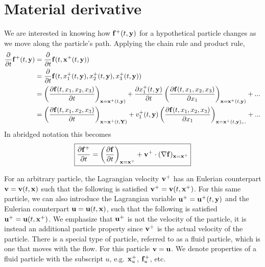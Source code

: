 \documentclass[oneside,a4paper,11pt]{report}
\begin{document}
\section{Material derivative}

We are interested in knowing how $\mathbf{f}^+(t,\mathbf{y})$ for a hypothetical particle changes as we move along the particle's path. Applying the chain rule and product rule,
\begin{align}
\frac{\partial}{\partial t} \mathbf{f}^+(t,\mathbf{y})&= \frac{\partial}{\partial t} \mathbf{f}(t,\mathbf{x}^+(t,\mathbf{y})) \nonumber \\
&=  \frac{\partial}{\partial t} \mathbf{f}(t,x_1^+(t,\mathbf{y}), x_2^+(t,\mathbf{y}), x_3^+(t,\mathbf{y})) \nonumber \\
&=\left( \frac{\partial \mathbf{f}(t,x_1,x_2,x_3)}{\partial t}\right )_{\mathbf{x}=\mathbf{x}^+(t,\mathbf{y})} + \frac{\partial x_1^+(t,\mathbf{y})}{\partial t} \left ( \frac{\partial \mathbf{f}(t,x_1,x_2,x_3)}{\partial x_1} \right )_{\mathbf{x} = \mathbf{x}^+(t,\mathbf{y})} + ...\nonumber \\
&=\left ( \frac{\partial \mathbf{f}(t,x_1,x_2,x_3)}{\partial t} \right)_{\mathbf{x}=\mathbf{x}^+(t,\mathbf{Y})} + v_1^+(t,\mathbf{y}) \left ( \frac{\partial \mathbf{f}(t,x_1,x_2,x_3)}{\partial x_1} \right )_{\mathbf{x}=\mathbf{x}^+(t,\mathbf{y}),..} + ...
\end{align}
In abridged notation this becomes
\begin{equation}
\label{eq:material_derivative_generic}
\boxed{
\frac{\partial \mathbf{f}^+}{\partial t} = \left ( \frac{\partial \mathbf{f}}{\partial t} \right)_{\mathbf{x}=\mathbf{x}^+} + \mathbf{v}^+ \cdot ( \nabla \mathbf{f})_{\mathbf{x}=\mathbf{x}^+}
}
\end{equation}

For an arbitrary particle, the Lagrangian velocity $\mathbf{v}^+$ has an Eulerian counterpart $\mathbf{v}=\mathbf{v}(t,\mathbf{x})$ such that the following is satisfied $\mathbf{v}^+ = \mathbf{v}(t,\mathbf{x}^+)$. For this same particle, we can also introduce the Lagrangian variable $\mathbf{u}^+ = \mathbf{u}^+(t,\mathbf{y})$ and the Eulerian counterpart $\mathbf{u} = \mathbf{u}(t,\mathbf{x})$, such that the following is satisfied $\mathbf{u}^+ = \mathbf{u}(t,\mathbf{x}^+)$. We emphasize that $\mathbf{u}^+$ is not the velocity of the particle, it is instead an additional particle property since $\mathbf{v}^+$ is the actual velocity of the particle. There is a special type of particle, referred to as a fluid particle, which is one that moves with the flow. For this particle $\mathbf{v} = \mathbf{u}$. We denote properties of a fluid particle with the subscript $u$, e.g. $\mathbf{x}^+_u$, $\mathbf{f}^+_u$, etc.
\end{document}
